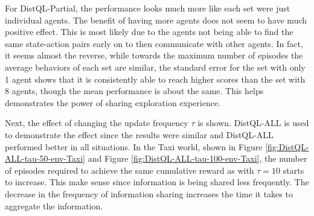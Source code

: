 \documentclass[jair,twoside,11pt,theapa]{article}
\begin{document}
For DistQL-Partial, the performance looks much more like each set were just individual agents. The benefit of having more agents does not seem to have much positive effect. This is most likely due to the agents not being able to find the same state-action pairs early on to then communicate with other agents. In fact, it seems almost the reverse, while towards the maximum number of episodes the average behaviors of each set are similar, the standard error for the set with only 1 agent shows that it is consistently able to reach higher scores than the set with 8 agents, though the mean performance is about the same. This helps demonstrates the power of sharing exploration experience. 

Next, the effect of changing the update frequency $\tau$ is shown. DistQL-ALL is used to demonstrate the effect since the results were similar and DistQL-ALL performed better in all situations. In the Taxi world, shown in Figure \ref{fig:DistQL-ALL-tau-50-env-Taxi} and Figure \ref{fig:DistQL-ALL-tau-100-env-Taxi}, the number of episodes required to achieve the same cumulative reward as with $\tau=10$ starts to increase. This make sense since information is being shared less frequently. The decrease in the frequency of information sharing increases the time it takes to aggregate the information.
\end{document}
